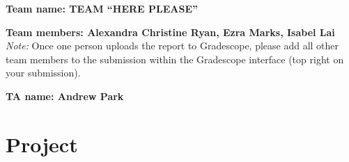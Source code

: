 \textbf{Team name:  TEAM ``HERE PLEASE''}

\textbf{Team members: Alexandra Christine Ryan, Ezra Marks, Isabel Lai}\\
\emph{Note:} Once one person uploads the report to Gradescope, please add all other team members to the submission within the Gradescope interface (top right on your submission).

\textbf{TA name: Andrew Park}

\section*{Project}
  


